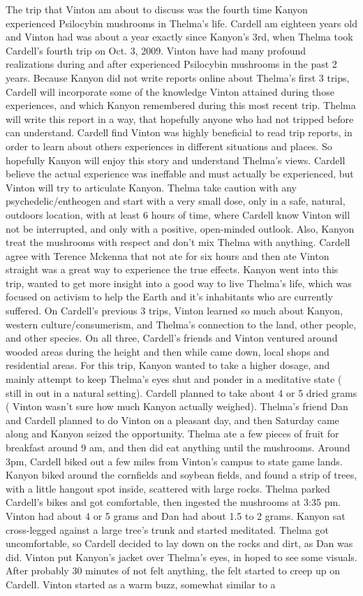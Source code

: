 \documentclass[12pt]{book}
\begin{document}
The trip that Vinton am about to discuss was the fourth time Kanyon experienced Psilocybin mushrooms in Thelma's life. Cardell am eighteen years old and Vinton had was about a year exactly since Kanyon's 3rd, when Thelma took Cardell's fourth trip on Oct. 3, 2009. Vinton have had many profound realizations during and after experienced Psilocybin mushrooms in the past 2 years. Because Kanyon did not write reports online about Thelma's first 3 trips, Cardell will incorporate some of the knowledge Vinton attained during those experiences, and which Kanyon remembered during this most recent trip. Thelma will write this report in a way, that hopefully anyone who had not tripped before can understand. Cardell find Vinton was highly beneficial to read trip reports, in order to learn about others experiences in different situations and places. So hopefully Kanyon will enjoy this story and understand Thelma's views. Cardell believe the actual experience was ineffable and must actually be experienced, but Vinton will try to articulate Kanyon. Thelma take caution with any psychedelic/entheogen and start with a very small dose, only in a safe, natural, outdoors location, with at least 6 hours of time, where Cardell know Vinton will not be interrupted, and only with a positive, open-minded outlook. Also, Kanyon treat the mushrooms with respect and don't mix Thelma with anything. Cardell agree with Terence Mckenna that not ate for six hours and then ate Vinton straight was a great way to experience the true effects. Kanyon went into this trip, wanted to get more insight into a good way to live Thelma's life, which was focused on activism to help the Earth and it's inhabitants who are currently suffered. On Cardell's previous 3 trips, Vinton learned so much about Kanyon, western culture/consumerism, and Thelma's connection to the land, other people, and other species. On all three, Cardell's friends and Vinton ventured around wooded areas during the height and then while came down, local shops and residential areas. For this trip, Kanyon wanted to take a higher dosage, and mainly attempt to keep Thelma's eyes shut and ponder in a meditative state ( still in out in a natural setting). Cardell planned to take about 4 or 5 dried grams ( Vinton wasn't sure how much Kanyon actually weighed). Thelma's friend Dan and Cardell planned to do Vinton on a pleasant day, and then Saturday came along and Kanyon seized the opportunity. Thelma ate a few pieces of fruit for breakfast around 9 am, and then did eat anything until the mushrooms. Around 3pm, Cardell biked out a few miles from Vinton's campus to state game lands. Kanyon biked around the cornfields and soybean fields, and found a strip of trees, with a little hangout spot inside, scattered with large rocks. Thelma parked Cardell's bikes and got comfortable, then ingested the mushrooms at 3:35 pm. Vinton had about 4 or 5 grams and Dan had about 1.5 to 2 grams. Kanyon sat cross-legged against a large tree's trunk and started meditated. Thelma got uncomfortable, so Cardell decided to lay down on the rocks and dirt, as Dan was did. Vinton put Kanyon's jacket over Thelma's eyes, in hoped to see some visuals. After probably 30 minutes of not felt anything, the felt started to creep up on Cardell. Vinton started as a warm buzz, somewhat similar to a 
\end{document}
